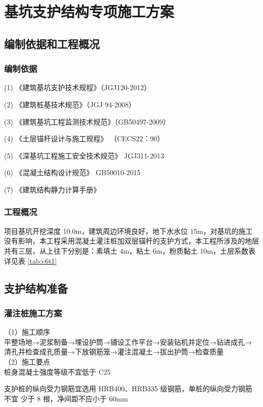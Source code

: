 \section{基坑支护结构专项施工方案}
\subsection{编制依据和工程概况}
\subsubsection{编制依据}

(1) 《建筑基坑支护技术规程》（JGJ120-2012）

(2) 《建筑桩基技术规范》（JGJ 94-2008）

(3) 《建筑基坑工程监测技术规范》（GB50497-2009）

(4) 《土层锚杆设计与施工规程》 （CECS22：90）

(5) 《深基坑工程施工安全技术规范》 JGJ311-2013

(6) 《混凝土结构设计规范》 GB50010-2015

(7) 《建筑结构静力计算手册》

\subsubsection{工程概况}

项目基坑开挖深度 10.0m，建筑周边环境良好，地下水水位 15m，对基坑的施工没有影响，本工程采用混凝土灌注桩加双层锚杆的支护方式，本工程所涉及的地层
共有三层，从上往下分别是：素填土 4m，粘土 6m，粉质黏土 10m，土层系数表详见表 \ref{tab:c6t1} 

\subsection{支护结构准备}
\subsubsection{灌注桩施工方案}

（1）施工顺序\\

平整场地→泥浆制备→埋设护筒→铺设工作平台→安装钻机并定位→钻进成孔→ 清孔并检查成孔质量→下放钢筋笼→灌注混凝土→拔出护筒→检查质量\\

（2）施工要点\\

 桩身混凝土强度等级不宜低于 C25

 支护桩的纵向受力钢筋宜选用 HRB400、HRB335 级钢筋，单桩的纵向受力钢筋不宜
少于 8 根，净间距不应小于 60mm

